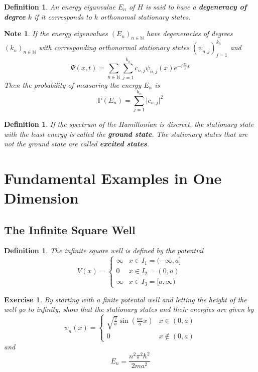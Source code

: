 \documentclass[12pt]{amsart}
\newtheorem{defn}[thm]{Definition}
\newtheorem{note}[thm]{Note}
\newtheorem{ex}[thm]{Exercise}
\newcommand{\N}{\mathbb{N}}
\renewcommand{\P}{\mathbb{P}}
\begin{document}
\begin{defn}
An energy eiganvalue $E_n$ of $H$ is said to have a \textbf{degeneracy of degree} $k$ if it corresponds to $k$ orthonomal stationary states. 
\end{defn}

\begin{note}
If the energy eigenvalues $(E_n)_{n \in \N}$ have degeneracies of degrees $(k_n)_{n \in \N}$ with corresponding orthonormal stationary states $(\psi_{n,j})_{j=1}^{k_n}$ and $$\Psi(x,t) = \sum_{n \in \N} \sum_{j =1}^{k_n}c_{n,j} \psi_{n,j}(x)e^{-i \frac{E_n}{\hbar}t}$$ Then the probability of measuring the energy $E_n$ is $$\P(E_n) = \sum_{j=1}^{k_n} \vert c_{n,j}\vert^2$$
\end{note}

\begin{defn}
If the spectrum of the Hamiltonian is discreet, the stationary state with the least energy is called the \textbf{ground state}. The stationary states that are not the ground state are called \textbf{excited states}.
\end{defn}

\section{Fundamental Examples in One Dimension}

\subsection{The Infinite Square Well}

\begin{defn}
The infinite square well is defined by the potential 
\[
V(x) = 
\begin{cases}
\infty & x \in I_1 = (-\infty, a]\\
0 & x \in I_2 = (0,a)\\
\infty &x \in I_3 = [a,\infty)
\end{cases}
\]
\end{defn}

\begin{ex}
By starting with a finite potental well and letting the height of the well go to infinity, show that the stationary states and their  energies are given by $$\psi_n(x)= 
\begin{cases}
\sqrt{\frac{2}{a}}\sin(\frac{n \pi}{a}x)  & x \in (0,a) \\
0 & x \not \in (0,a)
\end{cases} $$ 
and 
$$E_n = \frac{n^2 \pi^2 \hbar^2}{2ma^2}$$
\end{ex}
\end{document}
